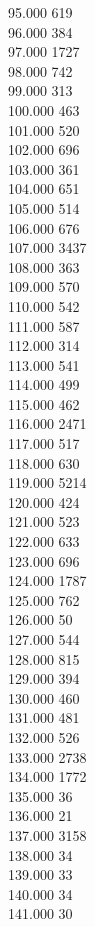 { 95.000	619 \\
 96.000	384 \\
 97.000	1727 \\
 98.000	742 \\
 99.000	313 \\
 100.000	463 \\
 101.000	520 \\
 102.000	696 \\
 103.000	361 \\
 104.000	651 \\
 105.000	514 \\
 106.000	676 \\
 107.000	3437 \\
 108.000	363 \\
 109.000	570 \\
 110.000	542 \\
 111.000	587 \\
 112.000	314 \\
 113.000	541 \\
 114.000	499 \\
 115.000	462 \\
 116.000	2471 \\
 117.000	517 \\
 118.000	630 \\
 119.000	5214 \\
 120.000	424 \\
 121.000	523 \\
 122.000	633 \\
 123.000	696 \\
 124.000	1787 \\
 125.000	762 \\
 126.000	50 \\
 127.000	544 \\
 128.000	815 \\
 129.000	394 \\
 130.000	460 \\
 131.000	481 \\
 132.000	526 \\
 133.000	2738 \\
 134.000	1772 \\
 135.000	36 \\
 136.000	21 \\
 137.000	3158 \\
 138.000	34 \\
 139.000	33 \\
 140.000	34 \\
 141.000	30 \\
}
